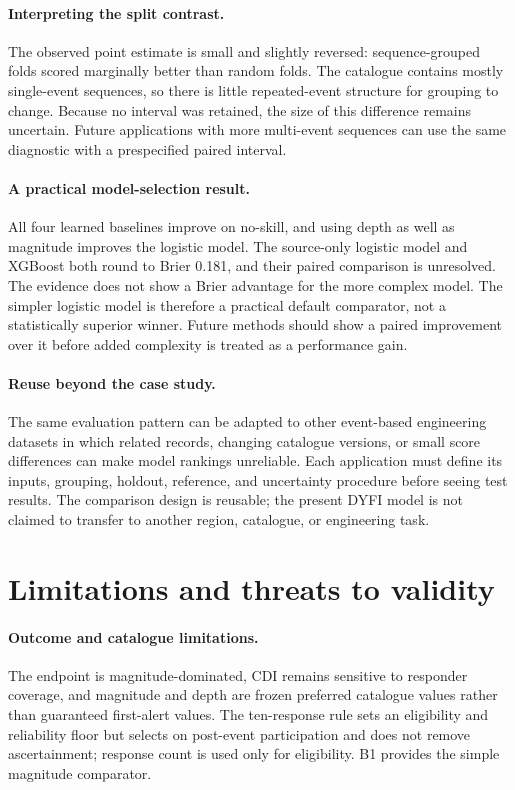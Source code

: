 \documentclass[pdflatex,sn-basic,Numbered]{sn-jnl}
\begin{document}
\paragraph{Interpreting the split contrast.} The observed point estimate is
small and slightly reversed: sequence-grouped folds scored marginally better
than random folds. The catalogue contains mostly single-event sequences, so
there is little repeated-event structure for grouping to change. Because no
interval was retained, the size of this difference remains uncertain. Future
applications with more multi-event sequences can use the same diagnostic with a
prespecified paired interval.

\paragraph{A practical model-selection result.} All four learned baselines
improve on no-skill, and using depth as well as magnitude improves the logistic
model. The source-only logistic model and XGBoost both round to Brier 0.181, and
their paired comparison is
unresolved. The evidence does not show a Brier
advantage for the more complex model. The simpler logistic model is therefore a
practical default comparator, not a statistically superior winner. Future methods
should show a paired improvement over it before added complexity is treated as
a performance gain.

\paragraph{Reuse beyond the case study.} The same evaluation pattern can be
adapted to other event-based engineering datasets in which related records,
changing catalogue versions, or small score differences can make model rankings
unreliable. Each application must define its inputs, grouping, holdout,
reference, and uncertainty procedure before seeing test results. The comparison
design is reusable; the present DYFI model is not claimed to transfer to another
region, catalogue, or engineering task.

\section{Limitations and threats to validity}\label{sec:limitations}

\paragraph{Outcome and catalogue limitations.} The endpoint is
magnitude-dominated, CDI remains sensitive to responder coverage, and magnitude
and depth are frozen preferred catalogue values rather than guaranteed
first-alert values. The ten-response rule sets an eligibility and reliability
floor but selects on post-event participation and does not remove ascertainment;
response count is used only for eligibility. B1 provides the simple magnitude
comparator.
\end{document}
